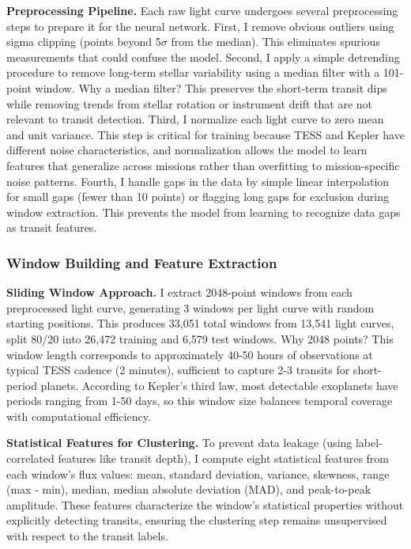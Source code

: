 \documentclass[letterpaper]{article} %
\begin{document}
\textbf{Preprocessing Pipeline.} Each raw light curve undergoes several preprocessing steps to prepare it for the neural network. First, I remove obvious outliers using sigma clipping (points beyond 5$\sigma$ from the median). This eliminates spurious measurements that could confuse the model. Second, I apply a simple detrending procedure to remove long-term stellar variability using a median filter with a 101-point window. Why a median filter? This preserves the short-term transit dips while removing trends from stellar rotation or instrument drift that are not relevant to transit detection. Third, I normalize each light curve to zero mean and unit variance. This step is critical for training because TESS and Kepler have different noise characteristics, and normalization allows the model to learn features that generalize across missions rather than overfitting to mission-specific noise patterns. Fourth, I handle gaps in the data by simple linear interpolation for small gaps (fewer than 10 points) or flagging long gaps for exclusion during window extraction. This prevents the model from learning to recognize data gaps as transit features.

\subsubsection{Window Building and Feature Extraction}
\textbf{Sliding Window Approach.} I extract 2048-point windows from each preprocessed light curve, generating 3 windows per light curve with random starting positions. This produces 33,051 total windows from 13,541 light curves, split 80/20 into 26,472 training and 6,579 test windows. Why 2048 points? This window length corresponds to approximately 40-50 hours of observations at typical TESS cadence (2 minutes), sufficient to capture 2-3 transits for short-period planets. According to Kepler's third law, most detectable exoplanets have periods ranging from 1-50 days, so this window size balances temporal coverage with computational efficiency.

\textbf{Statistical Features for Clustering.} To prevent data leakage (using label-correlated features like transit depth), I compute eight statistical features from each window's flux values: mean, standard deviation, variance, skewness, range (max - min), median, median absolute deviation (MAD), and peak-to-peak amplitude. These features characterize the window's statistical properties without explicitly detecting transits, ensuring the clustering step remains unsupervised with respect to the transit labels.
\end{document}
